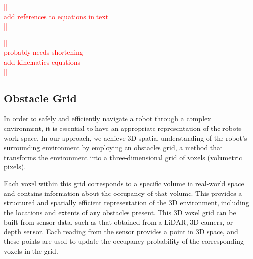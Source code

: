 \documentclass[a4paper]{article}
\newcommand\todocomment[1]{\textcolor{red}{||\\ #1\\||}}
\begin{document}
\todocomment{add references to equations in text}

\todocomment{probably needs shortening \\
			 add kinematics equations}

\subsection{Obstacle Grid}

In order to safely and efficiently navigate a robot through a complex environment, it is essential to have an appropriate representation of the robots work space. In our approach, we achieve 3D spatial understanding of the robot's surrounding environment by employing an obstacles grid, a method that transforms the environment into a three-dimensional grid of voxels (volumetric pixels).

Each voxel within this grid corresponds to a specific volume in real-world space and contains information about the occupancy of that volume. This provides a structured and spatially efficient representation of the 3D environment, including the locations and extents of any obstacles present. This 3D voxel grid can be built from sensor data, such as that obtained from a LiDAR, 3D camera, or depth sensor. Each reading from the sensor provides a point in 3D space, and these points are used to update the occupancy probability of the corresponding voxels in the grid.



%
%
\end{document}

